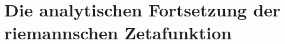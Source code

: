 %
%
%
%

\chapter{Die analytischen Fortsetzung
	der riemannschen Zetafunktion
	\label{chapter:hankel}}
\begin{refsection}
%
%
	
	
	
	
	
	
	\printbibliography[heading=subbibliography]
\end{refsection}
